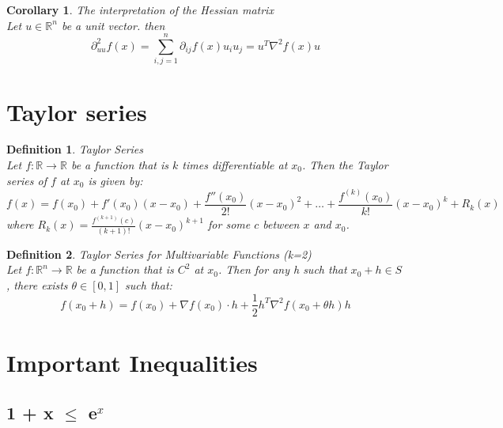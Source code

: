 \documentclass[11pt]{book} %
\newtheorem{definition}{Definition}[section]
\newtheorem*{corollary*}{Corollary}
\begin{document}
\bigbreak

\begin{corollary*}{The interpretation of the Hessian matrix} \\
Let $u \in \mathbb{R}^n$ be a unit vector. then
\begin{equation}
    \partial_{uu}^2 f(x) = \sum_{i,j=1}^n \partial_{ij} f(x) u_i u_j  = u^T \nabla^2 f(x) u
\end{equation}
\end{corollary*}

\bigbreak

\section{Taylor series}
\begin{definition}{Taylor Series} \\
Let $f: \mathbb{R} \rightarrow \mathbb{R}$ be a function that is $k$ times differentiable at $x_0$. Then the Taylor series of $f$ at $x_0$ is given by:
\begin{equation}
    f(x) = f(x_0) + f'(x_0)(x-x_0) + \frac{f''(x_0)}{2!}(x-x_0)^2 + \ldots + \frac{f^{(k)}(x_0)}{k!}(x-x_0)^k + R_k(x)
\end{equation}
where $R_k(x) = \frac{f^{(k+1)}(c)}{(k+1)!}(x-x_0)^{k+1}$ for some $c$ between $x$ and $x_0$.
\end{definition}

\bigbreak

\begin{definition}{Taylor Series for Multivariable Functions (k=2) } \\
Let $f: \mathbb{R}^n \rightarrow \mathbb{R}$ be a function that is $C^2$ at $x_0$. Then for any h such that $x_0 + h \in S$, there exists $\theta \in [0,1]$ such that:
\begin{equation}
    f(x_0 + h) = f(x_0) + \nabla f(x_0) \cdot h + \frac{1}{2} h^T \nabla^2 f(x_0 + \theta h) h
\end{equation}
\end{definition}

\bigbreak

\section{Important Inequalities}

\subsection{1 + x $\leq$ e$^{x}$}


\end{document}

